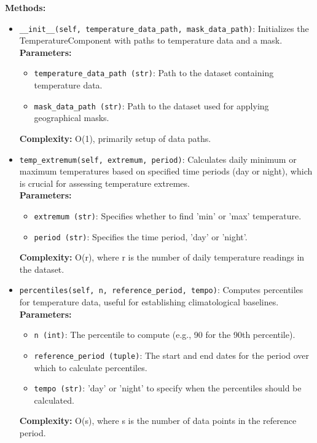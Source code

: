 \documentclass[a4paper,12pt]{article}
\begin{document}
\textbf{Methods:}
\begin{itemize}
    \item \texttt{\_\_init\_\_(self, temperature\_data\_path, mask\_data\_path)}: Initializes the TemperatureComponent with paths to temperature data and a mask. \\
    \textbf{Parameters:}
    \begin{itemize}
        \item \texttt{temperature\_data\_path (str)}: Path to the dataset containing temperature data.
        \item \texttt{mask\_data\_path (str)}: Path to the dataset used for applying geographical masks.
    \end{itemize}
    \textbf{Complexity:} O(1), primarily setup of data paths.

    \item \texttt{temp\_extremum(self, extremum, period)}: Calculates daily minimum or maximum temperatures based on specified time periods (day or night), which is crucial for assessing temperature extremes. \\
    \textbf{Parameters:}
    \begin{itemize}
        \item \texttt{extremum (str)}: Specifies whether to find 'min' or 'max' temperature.
        \item \texttt{period (str)}: Specifies the time period, 'day' or 'night'.
    \end{itemize}
    \textbf{Complexity:} O(r), where r is the number of daily temperature readings in the dataset.

    \item \texttt{percentiles(self, n, reference\_period, tempo)}: Computes percentiles for temperature data, useful for establishing climatological baselines. \\
    \textbf{Parameters:}
    \begin{itemize}
        \item \texttt{n (int)}: The percentile to compute (e.g., 90 for the 90th percentile).
        \item \texttt{reference\_period (tuple)}: The start and end dates for the period over which to calculate percentiles.
        \item \texttt{tempo (str)}: 'day' or 'night' to specify when the percentiles should be calculated.
    \end{itemize}
    \textbf{Complexity:} O(s), where s is the number of data points in the reference period.
\end{itemize}
\end{document}
